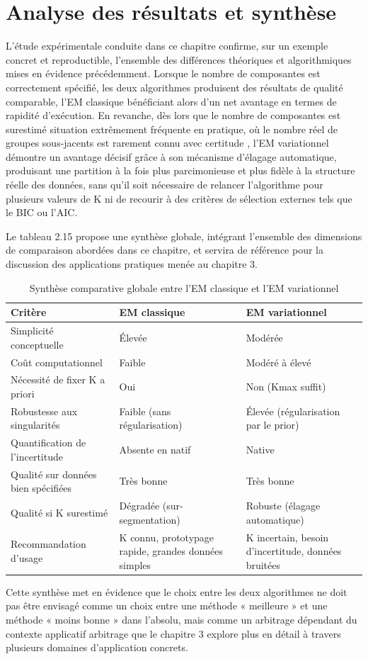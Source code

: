 \section{Analyse des résultats et synthèse}
L'étude expérimentale conduite dans ce chapitre confirme, sur un exemple concret et reproductible, l'ensemble des différences théoriques et algorithmiques mises en évidence précédemment. Lorsque le nombre de composantes est correctement spécifié, les deux algorithmes produisent des résultats de qualité comparable, l'EM classique bénéficiant alors d'un net avantage en termes de rapidité d'exécution. En revanche, dès lors que le nombre de composantes est surestimé  situation extrêmement fréquente en pratique, où le nombre réel de groupes sous-jacents est rarement connu avec certitude , l'EM variationnel démontre un avantage décisif grâce à son mécanisme d'élagage automatique, produisant une partition à la fois plus parcimonieuse et plus fidèle à la structure réelle des données, sans qu'il soit nécessaire de relancer l'algorithme pour plusieurs valeurs de K ni de recourir à des critères de sélection externes tels que le BIC ou l'AIC.

Le tableau 2.15 propose une synthèse globale, intégrant l'ensemble des dimensions de comparaison abordées dans ce chapitre, et servira de référence pour la discussion des applications pratiques menée au chapitre 3.

\begin{table}[H]
\centering
\small
\setlength{\tabcolsep}{0.14cm}
\begin{tabular}{|p{4.84cm}|p{4.84cm}|p{4.84cm}|}
\hline
\textbf{Critère} & \textbf{EM classique} & \textbf{EM variationnel} \\
\hline
Simplicité conceptuelle & Élevée & Modérée \\
\hline
Coût computationnel & Faible & Modéré à élevé \\
\hline
Nécessité de fixer K a priori & Oui & Non (Kmax suffit) \\
\hline
Robustesse aux singularités & Faible (sans régularisation) & Élevée (régularisation par le prior) \\
\hline
Quantification de l'incertitude & Absente en natif & Native \\
\hline
Qualité sur données bien spécifiées & Très bonne & Très bonne \\
\hline
Qualité si K surestimé & Dégradée (sur-segmentation) & Robuste (élagage automatique) \\
\hline
Recommandation d'usage & K connu, prototypage rapide, grandes données simples & K incertain, besoin d'incertitude, données bruitées \\
\hline
\end{tabular}
\caption{Synthèse comparative globale entre l'EM classique et l'EM variationnel}
\label{tab:2_15}
\end{table}
Cette synthèse met en évidence que le choix entre les deux algorithmes ne doit pas être envisagé comme un choix entre une méthode « meilleure » et une méthode « moins bonne » dans l'absolu, mais comme un arbitrage dépendant du contexte applicatif  arbitrage que le chapitre 3 explore plus en détail à travers plusieurs domaines d'application concrets.

